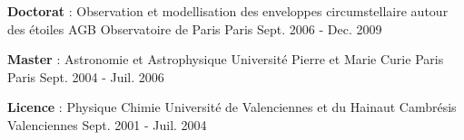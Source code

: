 

\begin{cventries}

  \cventry
    {\textbf{Doctorat} : Observation et modellisation des enveloppes circumstellaire autour des étoiles AGB} %
    {Observatoire de Paris} %
    {Paris} %
    {Sept. 2006 - Dec. 2009} %
    {
    }

  \cventry
    {\textbf{Master} : Astronomie et Astrophysique} %
    {Université Pierre et Marie Curie Paris} %
    {Paris} %
    {Sept. 2004 - Juil. 2006} %
    {
    }

  \cventry
    {\textbf{Licence} : Physique Chimie} %
    {Université de Valenciennes et du Hainaut Cambrésis} %
    {Valenciennes} %
    {Sept. 2001 - Juil. 2004} %
    {
    }

\end{cventries}
